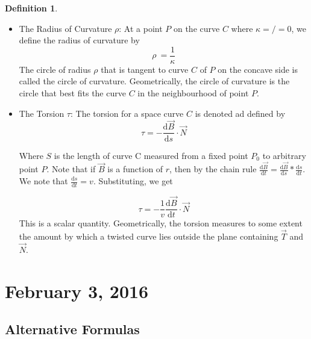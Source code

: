 \documentclass[11pt]{article}
\theoremstyle{plain} %
\theoremstyle{definition}
\newtheorem*{definition}{Definition} %
\theoremstyle{example}
\theoremstyle{remark}
\begin{document}
\begin{definition}
\begin{itemize}
		
		
		\item The Radius of Curvature $\rho$: At a point $P$ on the curve $C$ where $\kappa =/= 0$, we define the radius of curvature by $$\rho \ = \frac{1}{\kappa}$$ The circle of radius $\rho$ that is tangent to curve $C$ of $P$ on the concave side is called the circle of curvature. Geometrically, the circle of curvature is the circle that best fits the curve $C$ in the neighbourhood of point $P$. 
		\item The Torsion $\tau$: The torsion for a space curve $C$ is denoted ad defined by
		$$\tau = -\frac{\mathrm d \vec{B}}{\mathrm d s} \cdot \vec{N}$$
		
		Where $S$ is the length of curve C measured from a fixed point $P_0$ to arbitrary point $P$.  Note that if $\vec{B}$ is a function of $r$, then by the chain rule $\frac{\mathrm d \vec{B}}{\mathrm d t} = \frac{\mathrm d \vec{B}}{\mathrm d s} * \frac{\mathrm d s}{\mathrm d t}$. We note that $\frac{\mathrm d s}{\mathrm d t} = v$. Substituting, we get 
		
		$$\tau = -\frac{1}{v}\frac{\mathrm d \vec{B}}{\mathrm d t}\cdot\vec{N}$$
		This is a scalar quantity. Geometrically, the torsion measures to some extent the amount by which a twisted curve lies outside the plane containing $\vec{T}$ and $\vec{N}$. 
	\end{itemize}

\end{definition}
































\section{February 3, 2016}

\subsection{Alternative Formulas}
\end{document}
